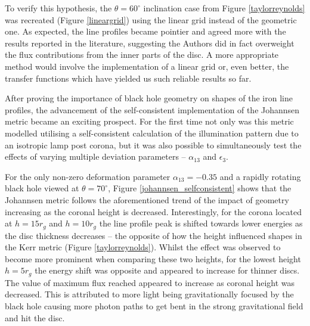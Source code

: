 \documentclass[fleqn,usenatbib,useAMS]{mnras}
\begin{document}
To verify this hypothesis, the $\theta = 60^{\circ}$ inclination case from Figure \ref{taylorreynolds} was recreated (Figure \ref{lineargrid}) using the linear grid instead of the geometric one. As expected, the line profiles became pointier and agreed more with the results reported in the literature, suggesting the Authors did in fact overweight the flux contributions from the inner parts of the disc. A more appropriate method would involve the implementation of a linear grid or, even better, the transfer functions which have yielded us such reliable results so far.

After proving the importance of black hole geometry on shapes of the iron line profiles, the advancement of the self-consistent implementation of the Johannsen metric became an exciting prospect. For the first time not only was this metric modelled utilising a self-consistent calculation of the illumination pattern due to an isotropic lamp post corona, but it was also possible to simultaneously test the effects of varying multiple deviation parameters -- $\alpha_{13}$ and $\epsilon_{3}$.

For the only non-zero deformation parameter $\alpha_{13} = -0.35$ and a rapidly rotating black hole viewed at $\theta = 70^{\circ}$, Figure \ref{johannsen_selfconsistent} shows that the Johannsen metric follows the aforementioned trend of the impact of geometry increasing as the coronal height is decreased. Interestingly, for the corona located at $h = 15 r_{g}$ and $h = 10 r_{g}$ the line profile peak is shifted towards lower energies as the disc thickness decreases – the opposite of how the height influenced shapes in the Kerr metric (Figure \ref{taylorreynolds}). Whilst the effect was observed to become more prominent when comparing these two heights, for the lowest height $h = 5 r_{g}$ the energy shift was opposite and appeared to increase for thinner discs. The value of maximum flux reached appeared to increase as coronal height was decreased. This is attributed to more light being gravitationally focused by the black hole causing more photon paths to get bent in the strong gravitational field and hit the disc.
\end{document}
